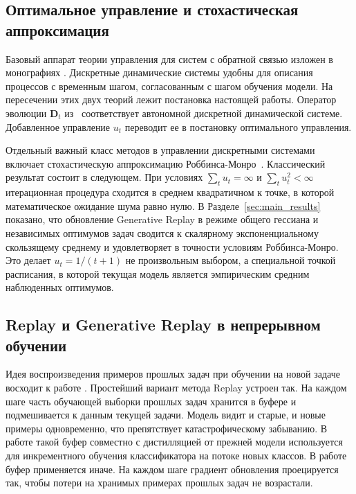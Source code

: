 \documentclass[a4paper,14pt,oneside,openany]{extarticle}
\newcommand{\bD}{\mathbf{D}}
\begin{document}
\subsection{Оптимальное управление и стохастическая аппроксимация}

Базовый аппарат теории управления для систем с обратной связью изложен в монографиях \cite{andrievsky2019theory, emelyanov2014mathematical}. Дискретные динамические системы \cite{galor2007discrete, sandefur1990discrete} удобны для описания процессов с временным шагом, согласованным с шагом обучения модели. На пересечении этих двух теорий лежит постановка настоящей работы. Оператор эволюции $\bD_t$ из~\cite{veprikov2025mathematical} соответствует автономной дискретной динамической системе. Добавленное управление $u_t$ переводит ее в постановку оптимального управления.

Отдельный важный класс методов в управлении дискретными системами включает стохастическую аппроксимацию Роббинса-Монро~\cite{robbins1951stochastic}. Классический результат состоит в следующем. При условиях $\sum_t u_t = \infty$ и $\sum_t u_t^2 < \infty$ итерационная процедура сходится в среднем квадратичном к точке, в которой математическое ожидание шума равно нулю. В Разделе~\ref{sec:main_results} показано, что обновление Generative Replay в режиме общего гессиана и независимых оптимумов задач сводится к скалярному экспоненциальному скользящему среднему и удовлетворяет в точности условиям Роббинса-Монро. Это делает $u_t = 1/(t+1)$ не произвольным выбором, а специальной точкой расписания, в которой текущая модель является эмпирическим средним наблюденных оптимумов.

\subsection{Replay и Generative Replay в непрерывном обучении}

Идея воспроизведения примеров прошлых задач при обучении на новой задаче восходит к работе \cite{robins1995catastrophic}. Простейший вариант метода Replay устроен так. На каждом шаге часть обучающей выборки прошлых задач хранится в буфере и подмешивается к данным текущей задачи. Модель видит и старые, и новые примеры одновременно, что препятствует катастрофическому забыванию. В работе \cite{rebuffi2017icarl} такой буфер совместно с дистилляцией от прежней модели используется для инкрементного обучения классификатора на потоке новых классов. В работе \cite{lopezpaz2017gradient} буфер применяется иначе. На каждом шаге градиент обновления проецируется так, чтобы потери на хранимых примерах прошлых задач не возрастали.
\end{document}
